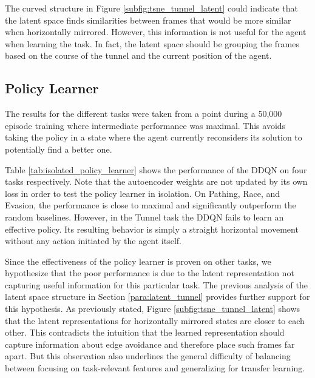The curved structure in Figure \ref{subfig:tsne_tunnel_latent} could indicate that the latent space finds similarities between frames that would be more similar when horizontally mirrored.
However, this information is not useful for the agent when learning the task. In fact, the latent space should be grouping the frames based on the course of the tunnel and the current position of the agent. 

\subsection{Policy Learner}
The results for the different tasks were taken from a point during a 50,000 episode training where intermediate performance was maximal. This avoids taking the policy in a state where the agent currently reconsiders its solution to potentially find a better one.

Table \ref{tab:isolated_policy_learner} shows the performance of the DDQN on four tasks respectively. 
Note that the autoencoder weights are not updated by its own loss in order to test the policy learner in isolation.
On Pathing, Race, and Evasion, the performance is close to maximal and significantly outperform the random baselines.
However, in the Tunnel task the DDQN fails to learn an effective policy.
Its resulting behavior is simply a straight horizontal movement without any action initiated by the agent itself.

Since the effectiveness of the policy learner is proven on other tasks, we hypothesize that the poor performance is due to the latent representation not capturing useful information for this particular task.
The previous analysis of the latent space structure in Section \ref{para:latent_tunnel} provides further support for this hypothesis.
As previously stated, Figure \ref{subfig:tsne_tunnel_latent} shows that the latent representations for horizontally mirrored states are closer to each other. 
This contradicts the intuition that the learned representation should capture information about edge avoidance and therefore place such frames far apart.
But this observation also underlines the general difficulty of balancing between focusing on task-relevant features and generalizing for transfer learning.


